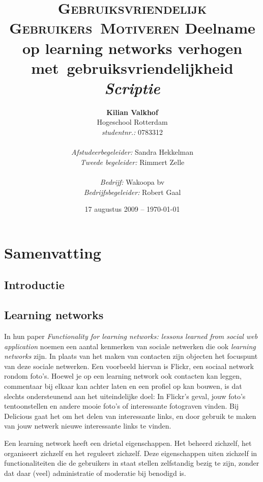 \documentclass[a4paper, 10pt, pdftex]{report}
\title{\textsc{Gebruiksvriendelijk Gebruikers~Motiveren}
  \linebreak Deelname op learning networks verhogen met~gebruiksvriendelijkheid \linebreak \linebreak \emph{Scriptie}}
\author{\textbf{Kilian Valkhof}\\
  Hogeschool Rotterdam\\
  \textit{studentnr.:} 0783312\\
  \\
  \textit{Afstudeerbegeleider:} Sandra Hekkelman\\
  \textit{Tweede begeleider:} Rimmert Zelle\\
  \\
  \textit{Bedrijf:} Wakoopa bv\\
  \textit{Bedrijfsbegeleider:} Robert Gaal}
\date{17 augustus 2009 -- \today}
\begin{document}
  \normalem
  \maketitle

  \newpage
  \chapter*{Samenvatting}

  \newpage
  \tableofcontents

  \newpage
  \section*{Introductie}

    \section{Learning networks}
            In hun paper \emph{Functionality for learning networks: lessons learned from social web application} noemen \citeauthor{Berlanga2007} een aantal kenmerken van sociale netwerken die ook \emph{learning networks} zijn. In plaats van het maken van contacten zijn objecten het focuspunt van deze sociale netwerken. Een voorbeeld hiervan is Flickr, een sociaal network rondom foto's. Hoewel je op een learning network ook contacten kan leggen, commentaar bij elkaar kan achter laten en een profiel op kan bouwen, is dat slechts ondersteunend aan het uiteindelijke doel: In Flickr's geval, jouw foto's tentoonstellen en andere mooie foto's of interessante fotograven vinden. Bij Delicious gaat het om het delen van interessante links, en door gebruik te maken van jouw netwerk nieuwe interessante links te vinden.

            Een learning network heeft een drietal eigenschappen. Het beheerd zichzelf, het organiseert zichzelf en het reguleert zichzelf. Deze eigenschappen uiten zichzelf in functionaliteiten die de gebruikers in staat stellen zelfstandig bezig te zijn, zonder dat daar (veel) administratie of moderatie bij benodigd is.
\end{document}
